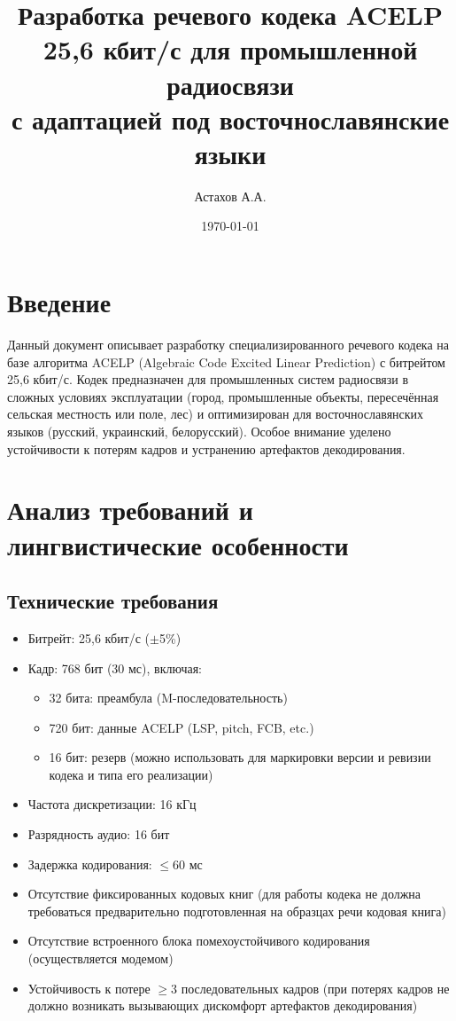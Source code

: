 \documentclass{report}
\title{Разработка речевого кодека ACELP 25,6 кбит/с для промышленной радиосвязи\\ с адаптацией под восточнославянские языки}
\author{Астахов А.А.}
\date{\today}
\begin{document}
	
	\maketitle
	
	\tableofcontents
	
	\chapter*{Введение}
	Данный документ описывает разработку специализированного речевого кодека на базе алгоритма ACELP (Algebraic Code Excited Linear Prediction) с битрейтом 25,6 кбит/с. Кодек предназначен для промышленных систем радиосвязи в сложных условиях эксплуатации (город, промышленные объекты, пересечённая сельская местность или поле, лес) и оптимизирован для восточнославянских языков (русский, украинский, белорусский). Особое внимание уделено устойчивости к потерям кадров и устранению артефактов декодирования.
	
	\chapter{Анализ требований и лингвистические особенности}
	\section{Технические требования}
	\begin{itemize}
		\item Битрейт: 25,6 кбит/с ($\pm$5\%)
		\item Кадр: 768 бит (30 мс), включая:
		\begin{itemize}
			\item 32 бита: преамбула (M-последовательность)
			\item 720 бит: данные ACELP (LSP, pitch, FCB, etc.)
			\item 16 бит: резерв (можно использовать для маркировки версии и ревизии кодека и типа его реализации)
		\end{itemize}
		\item Частота дискретизации: 16 кГц
		\item Разрядность аудио: 16 бит
		\item Задержка кодирования: $\leqslant$60 мс
		\item Отсутствие фиксированных кодовых книг (для работы кодека не должна требоваться предварительно подготовленная на образцах речи кодовая книга)
		\item Отсутствие встроенного блока помехоустойчивого кодирования (осуществляется модемом)
		\item Устойчивость к потере $\geqslant$3 последовательных кадров (при потерях кадров не должно возникать вызывающих дискомфорт артефактов декодирования)
	\end{itemize}
	
\end{document}
